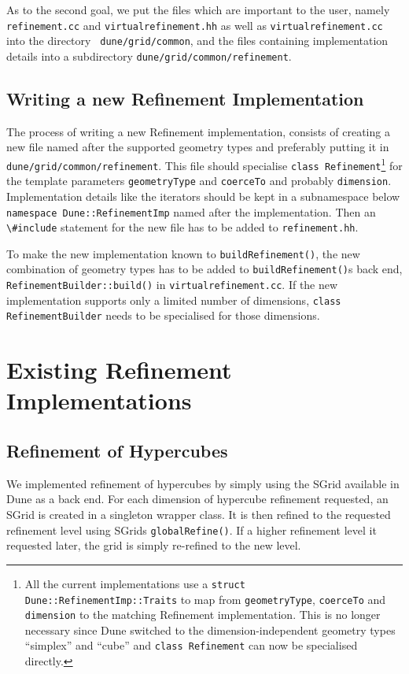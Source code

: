 \documentclass[english,a4paper]{article}
\newcommand{\code}[1]{\textnormal{\lstinline{#1}}}
\begin{document}
As to the second goal, we put the files which are important to the
user, namely {\tt refinement.cc} and {\tt virtualrefinement.hh} as
well as {\tt virtual\-re\-fine\-ment.cc} into the directory {\tt
  dune/grid/common}, and the files containing implementation details
into a subdirectory {\tt dune/grid/common/refinement}.

\subsection{Writing a new Refinement Implementation}

The process of writing a new Refinement implementation, consists of
creating a new file named after the supported geometry types and
preferably putting it in {\tt dune/grid/common/refinement}.  This file
should specialise \code{class Refinement}\footnote{All the current
  implementations use a \code{struct Dune::RefinementImp::Traits} to
  map from \code{geometryType}, \code{coerceTo} and \code{dimension}
  to the matching Refinement implementation.  This is no longer
  necessary since Dune switched to the dimension-independent geometry
  types ``simplex'' and ``cube'' and \code{class Refinement} can now
  be specialised directly.} for the template parameters
\code{geometryType} and \code{coerceTo} and probably \code{dimension}.
Implementation details like the iterators should be kept in a
subnamespace below \code{namespace Dune::RefinementImp} named after
the implementation.  Then an \code{\#include} statement for the new
file has to be added to {\tt refinement.hh}.

To make the new implementation known to \code{buildRefinement()}, the
new combination of geometry types has to be added to
\code{buildRefinement()}s back end, \code{RefinementBuilder::build()}
in {\tt virtualrefinement.cc}.  If the new implementation supports
only a limited number of dimensions, \code{class RefinementBuilder}
needs to be specialised for those dimensions.

\section{Existing Refinement Implementations}

\subsection{Refinement of Hypercubes}

We implemented refinement of hypercubes by simply using the SGrid
available in Dune as a back end.  For each dimension of hypercube
refinement requested, an SGrid is created in a singleton wrapper
class.  It is then refined to the requested refinement level using
SGrids \code{globalRefine()}.  If a higher refinement level it
requested later, the grid is simply re-refined to the new level.
\end{document}
